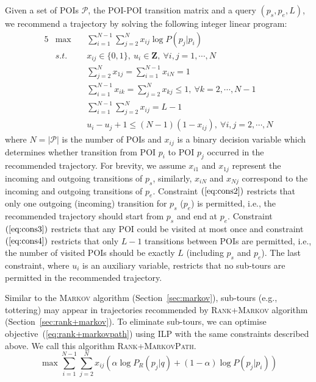 Given a set of POIs $\mathcal{P}$, the POI-POI transition matrix and a query $(p_s, p_e, L)$,
we recommend a trajectory by solving the following integer linear program:
\begin{alignat}{5}
& \max ~&& \sum_{i=1}^{N-1} \sum_{j=2}^N x_{ij} \log P(p_j | p_i)                          \nonumber \\
& s.t. ~&& x_{ij} \in \{0, 1\}, ~u_i \in \mathbf{Z}, ~\forall i, j = 1, \cdots, N          \label{eq:cons1} \\
&        && \sum_{j=2}^N x_{1j} = \sum_{i=1}^{N-1} x_{iN} = 1                               \label{eq:cons2} \\
&        && \sum_{i=1}^{N-1} x_{ik} = \sum_{j=2}^N x_{kj} \le 1, ~\forall k=2, \cdots, N-1  \label{eq:cons3} \\
&        && \sum_{i=1}^{N-1} \sum_{j=2}^N x_{ij} = L-1                                      \label{eq:cons4} \\
&        && u_i - u_j + 1 \le (N-1) (1-x_{ij}), ~\forall i, j = 2, \cdots, N                \label{eq:cons5}
\end{alignat}
where $N=|\mathcal{P}|$ is the number of POIs and $x_{ij}$ is a binary decision variable 
which determines whether transition from POI $p_i$ to POI $p_j$ occurred in the recommended trajectory.
For brevity, we assume $x_{i1}$ and $x_{1j}$ represent the incoming and outgoing transitions of $p_s$,
similarly, $x_{iN}$ and $x_{Nj}$ correspond to the incoming and outgoing transitions of $p_e$.
Constraint $(\ref{eq:cons2})$ restricts that only one outgoing (incoming) transition for $p_s$ ($p_e$) is permitted, 
i.e., the recommended trajectory should start from $p_s$ and end at $p_e$.
Constraint $(\ref{eq:cons3})$ restricts that any POI could be visited at most once and 
constraint $(\ref{eq:cons4})$ restricts that only $L-1$ transitions between POIs are permitted, 
i.e., the number of visited POIs should be exactly $L$ (including $p_s$ and $p_e$).
The last constraint, where $u_i$ is an auxiliary variable, restricts that no sub-tours are permitted in the recommended trajectory.

Similar to the \textsc{Markov} algorithm (Section~\ref{sec:markov}),
sub-tours (e.g., tottering) may appear in trajectories recommended by \textsc{Rank+Markov} algorithm (Section~\ref{sec:rank+markov}).
To eliminate sub-tours, we can optimise objective~(\ref{eq:rank+markovpath}) using ILP with the same constraints described above.
We call this algorithm \textsc{Rank+MarkovPath}.
\begin{equation}
\label{eq:rank+markovpath}
\max \sum_{i=1}^{N-1} \sum_{j=2}^N x_{ij} (\alpha \log P_R(p_j | q) + (1-\alpha) \log P(p_j | p_i))
\end{equation}
